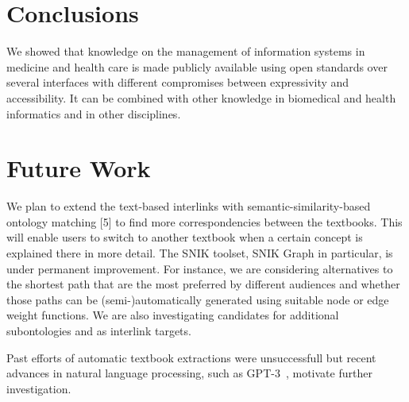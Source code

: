 \documentclass[conference]{IEEEtran}
\newcommand{\citet}{\cite}%
\newcommand{\citep}{\cite}%
\begin{document}
\section{Conclusions}
We showed that knowledge on the management of information systems in medicine and health care is made publicly available using open standards over several interfaces with different compromises between expressivity and accessibility.
It can be combined with other knowledge in biomedical and health informatics and in other disciplines.

\section{Future Work}
We plan to extend the text-based interlinks with semantic-similarity-based ontology matching [5] to find more correspondencies between the textbooks.
This will enable users to switch to another textbook when a certain concept is explained there in more detail.
The SNIK toolset, SNIK Graph in particular, is under permanent improvement.
For instance, we are considering alternatives to the shortest path that are the most preferred by different audiences and whether those paths can be (semi-)automatically generated using suitable node or edge weight functions.
We are also investigating candidates for additional subontologies and as interlink targets.

Past efforts of automatic textbook extractions were unsuccessfull but recent advances in natural language processing, such as GPT-3~\citep{gpt3}, motivate further investigation.

%


\end{document}
